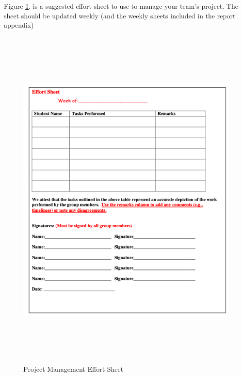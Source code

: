 \documentclass[12pt]{article}
\begin{document}
\clearpage

Figure \ref{fig:effortsheet}, is a suggested effort sheet to use to manage your team's project.  The sheet should be updated weekly (and the weekly sheets included in the report appendix)
\begin{figure}[h!] %
   \centering
   \includegraphics[height=7in]{effortsheet.png} 
   \caption{Project Management Effort Sheet}
   \label{fig:effortsheet}
\end{figure}

\clearpage


\end{document}
